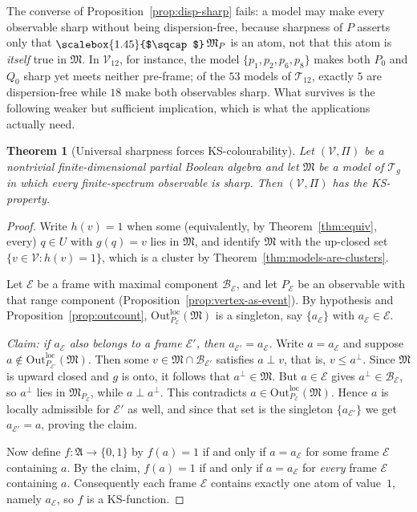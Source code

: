 \documentclass{article}   	%
\theoremstyle{plain}
\newtheorem{theorem}{Theorem}[section]
\theoremstyle{definition}
\theoremstyle{remark}
\newcommand{\Outloc}[2]{\mathrm{Out}^{\mathrm{loc}}_{#1}(#2)}
\providecommand{\bigsqcap}{\mathop{\raisebox{-0.25ex}{\scalebox{1.45}{$\sqcap$}}}}
\begin{document}
The converse of Proposition~\ref{prop:disp-sharp} fails: a model may make every
observable sharp without being dispersion-free, because sharpness of $P$ asserts
only that $\bigsqcap\mathfrak M_P$ is an atom, not that this atom is
\emph{itself} true in $\mathfrak M$.  In $\mathcal V_{12}$, for instance, the
model $\{p_1,p_2,p_6,p_8\}$ makes both $P_0$ and $Q_0$ sharp yet meets neither
pre-frame; of the $53$ models of $\mathcal T_{12}$, exactly $5$ are
dispersion-free while $18$ make both observables sharp.  What survives is the
following weaker but sufficient implication, which is what the applications
actually need.

\begin{theorem}[Universal sharpness forces KS-colourability]
\label{thm:sharp-implies-ks}
Let $(\mathcal V,\Pi)$ be a nontrivial finite-dimensional partial Boolean
algebra and let $\mathfrak M$ be a model of $\mathcal T_g$ in which
\emph{every} finite-spectrum observable is sharp.  Then $(\mathcal V,\Pi)$ has
the KS-property.
\end{theorem}

\begin{proof}
Write $h(v)=1$ when some (equivalently, by Theorem~\ref{thm:equiv}, every)
$q\in U$ with $g(q)=v$ lies in $\mathfrak M$, and identify $\mathfrak M$ with
the up-closed set $\{v\in\mathcal V:h(v)=1\}$, which is a cluster by
Theorem~\ref{thm:models-are-clusters}.

Let $\mathcal E$ be a frame with maximal component $\mathcal B_{\mathcal E}$,
and let $P_{\mathcal E}$ be an observable with that range component
(Proposition~\ref{prop:vertex-as-event}).  By hypothesis and
Proposition~\ref{prop:outcount},
$\Outloc{P_{\mathcal E}}{\mathfrak M}$ is a singleton, say
$\{a_{\mathcal E}\}$ with $a_{\mathcal E}\in\mathcal E$.

\emph{Claim: if $a_{\mathcal E}$ also belongs to a frame $\mathcal E'$, then
$a_{\mathcal E'}=a_{\mathcal E}$.}
Write $a=a_{\mathcal E}$ and suppose $a\notin
\Outloc{P_{\mathcal E'}}{\mathfrak M}$.  Then some
$v\in\mathfrak M\cap\mathcal B_{\mathcal E'}$ satisfies $a\perp v$, that is,
$v\le a^{\perp}$.  Since $\mathfrak M$ is upward closed and $g$ is onto, it
follows that $a^{\perp}\in\mathfrak M$.  But $a\in\mathcal E$ gives
$a^{\perp}\in\mathcal B_{\mathcal E}$, so $a^{\perp}$ lies in
$\mathfrak M_{P_{\mathcal E}}$, while $a\perp a^{\perp}$.  This contradicts
$a\in\Outloc{P_{\mathcal E}}{\mathfrak M}$.  Hence $a$ is locally admissible
for $\mathcal E'$ as well, and since that set is the singleton
$\{a_{\mathcal E'}\}$ we get $a_{\mathcal E'}=a$, proving the claim.

Now define $f:\mathfrak A\to\{0,1\}$ by $f(a)=1$ if and only if
$a=a_{\mathcal E}$ for some frame $\mathcal E$ containing $a$.  By the claim,
$f(a)=1$ if and only if $a=a_{\mathcal E}$ for \emph{every} frame $\mathcal E$
containing $a$.  Consequently each frame $\mathcal E$ contains exactly one atom
of value~$1$, namely $a_{\mathcal E}$, so $f$ is a KS-function.
\end{proof}
\end{document}
